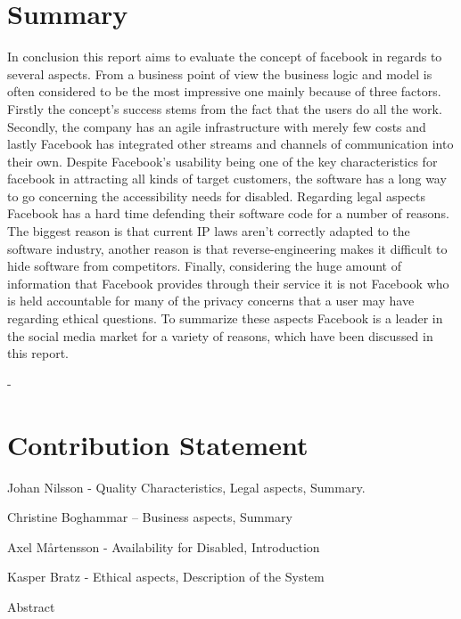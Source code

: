 \documentclass[conference]{IEEEtran}
\begin{document}
\section{Summary} 
\label{summary}
In conclusion this report aims to evaluate the concept of facebook in regards to several aspects. From a business point of view the business logic and model is often considered to be the most impressive one mainly because of three factors. Firstly the concept’s success stems from the fact that the users do all the work. Secondly, the company has an agile infrastructure with merely few costs and lastly Facebook has integrated other streams and channels of communication into their own. Despite Facebook’s usability being one of the key characteristics for facebook in attracting all kinds of target customers, the software has a long way to go concerning the accessibility needs for disabled. Regarding legal aspects Facebook has a hard time defending their software code for a number of reasons. The biggest reason is that current IP laws aren’t correctly adapted to the software industry, another reason is that reverse-engineering makes it difficult to hide software from competitors. 
Finally, considering the huge amount of information that Facebook provides through their service it is not Facebook who is held accountable for many of the privacy concerns that a user may have regarding ethical questions. To summarize these aspects Facebook is a leader in the social media market for a variety of reasons, which have been discussed in this report. 


- 
\section{Contribution Statement} 

Johan Nilsson - Quality
Characteristics, Legal aspects, Summary.

Christine Boghammar – Business aspects, Summary

Axel Mårtensson - Availability for Disabled, Introduction

Kasper Bratz - Ethical aspects, Description of the System

Abstract
\end{document}
